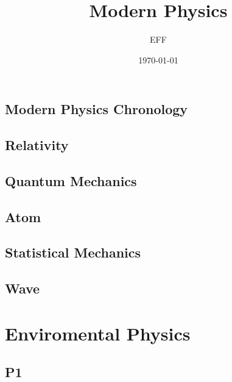 \documentclass[10pt]{report}
\title{Modern Physics}
\author{EFF}
\date{\today}
\begin{document}
\pagestyle{empty}


\clearpage

\section*{Modern Physics Chronology}

\clearpage 

\section*{Relativity}

\clearpage

\clearpage

\section*{Quantum Mechanics}

\clearpage

\section*{Atom}

\clearpage

\clearpage

\section*{Statistical Mechanics}

\clearpage

\section*{Wave}

\clearpage

\chapter*{Enviromental Physics}
\section*{P1}
\clearpage
\end{document}
